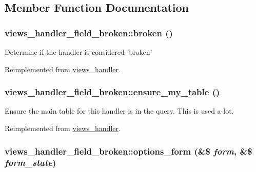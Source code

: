 \subsection{Member Function Documentation}
\hypertarget{classviews__handler__field__broken_f579634a7ec51fa709d7c0cddc135725}{
\subsubsection[{broken}]{\setlength{\rightskip}{0pt plus 5cm}views\_\-handler\_\-field\_\-broken::broken ()}}
\label{classviews__handler__field__broken_f579634a7ec51fa709d7c0cddc135725}


Determine if the handler is considered 'broken' 

Reimplemented from \hyperlink{classviews__handler_c1cd2ff30cb558c79cc908be516fb725}{views\_\-handler}.\hypertarget{classviews__handler__field__broken_887902026800149644e827fbb92dba15}{
\subsubsection[{ensure\_\-my\_\-table}]{\setlength{\rightskip}{0pt plus 5cm}views\_\-handler\_\-field\_\-broken::ensure\_\-my\_\-table ()}}
\label{classviews__handler__field__broken_887902026800149644e827fbb92dba15}


Ensure the main table for this handler is in the query. This is used a lot. 

Reimplemented from \hyperlink{classviews__handler_947f21ef0f21a77f4d103af4702b3600}{views\_\-handler}.\hypertarget{classviews__handler__field__broken_fc66860f4fb5a1878a131c30500e6e1d}{
\subsubsection[{options\_\-form}]{\setlength{\rightskip}{0pt plus 5cm}views\_\-handler\_\-field\_\-broken::options\_\-form (\&\$ {\em form}, \/  \&\$ {\em form\_\-state})}}
\label{classviews__handler__field__broken_fc66860f4fb5a1878a131c30500e6e1d}


